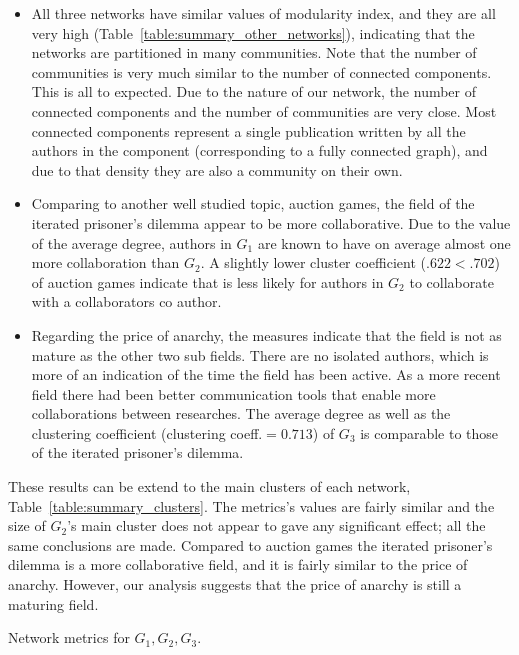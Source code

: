 \documentclass{article}
\theoremstyle{definition}
\begin{document}
\begin{itemize}
    \item All three networks have similar values of modularity index, and they are
    all very high (Table~\ref{table:summary_other_networks}), indicating that the
    networks are partitioned in many communities.
    Note that the number of
    communities is very much similar to the number of connected components.
    This is all to expected.
    Due to the nature of our network,
    the number of connected components and the number of communities are very close.
    Most connected components represent a single publication written by all the 
    authors in the component (corresponding to a fully connected graph), and due to that density they are
    also a community on their own.
    \item Comparing to another well studied topic, auction games, the field of the
    iterated prisoner's dilemma appear to be more collaborative. Due to the
    value of the average degree, authors in \(G_1\) are known to have on average almost
    one more collaboration than \(G_2\). A slightly lower cluster coefficient ($ .622 < .702$)
    of auction games indicate that is less likely for authors in \(G_2\) to collaborate
    with a collaborators co author.
    \item Regarding the price of anarchy, the measures indicate that the field
    is not as mature as the other two sub fields. There are no isolated authors,
    which is more of an indication of the time the field has been active. As a
    more recent field there had been better communication tools that enable more
    collaborations between researches. The average degree as well as the clustering
    coefficient (clustering coeff.$=0.713$) of \(G_3\) is comparable to those
    of the iterated prisoner's dilemma.
\end{itemize}

These results can be extend to the main clusters of each network, Table~\ref{table:summary_clusters}.
The metrics's values are fairly similar and the size of \(G_2\)'s main cluster
does not appear to gave any significant effect; all the same conclusions are made.
Compared to auction games the iterated prisoner's
dilemma is a more collaborative field, and it is fairly similar to the price of
anarchy. However, our analysis suggests that the price of anarchy is still a
maturing field.

\begin{table}[!hbtp]
    \centering
    \resizebox{\textwidth}{!}{
    }
    \caption{Network metrics for \(G_1, G_2, G_3\).}\label{table:summary_clusters}
\end{table}
\end{document}

